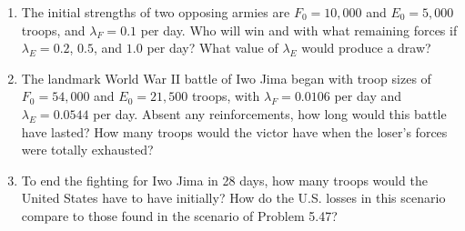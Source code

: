 \begin{enumerate}
    \item[\textbf{Problem 5.46.}] The initial strengths of two opposing armies are $F_0 = 10,000$ and $E_0 = 5,000$ troops, and $\lambda_F = 0.1$ per day. Who will win and with what remaining forces if $\lambda_E = 0.2$, $0.5$, and $1.0$ per day? What value of $\lambda_E$ would produce a draw?

    \item[\textbf{Problem 5.47.}] The landmark World War II battle of Iwo Jima began with troop sizes of $F_0 = 54,000$ and $E_0 = 21,500$ troops, with $\lambda_F = 0.0106$ per day and $\lambda_E = 0.0544$ per day. Absent any reinforcements, how long would this battle have lasted? How many troops would the victor have when the loser's forces were totally exhausted?

    \item[\textbf{Problem 5.48.}] To end the fighting for Iwo Jima in 28 days, how many troops would the United States have to have initially? How do the U.S. losses in this scenario compare to those found in the scenario of Problem 5.47?
\end{enumerate}
